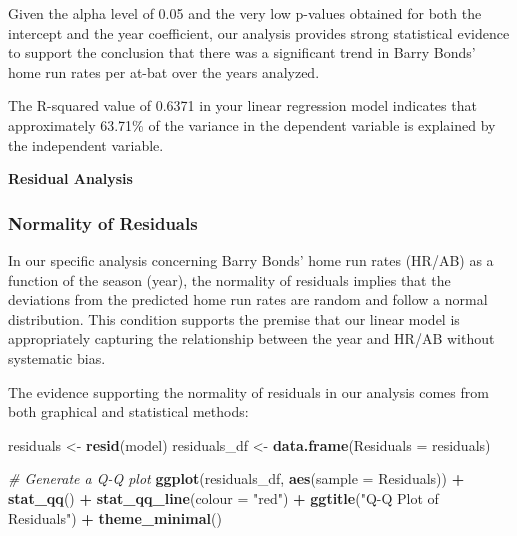 \documentclass[
]{article}
\newenvironment{Shaded}{\begin{snugshade}}{\end{snugshade}}
\newcommand{\AttributeTok}[1]{\textcolor[rgb]{0.13,0.29,0.53}{#1}}
\newcommand{\CommentTok}[1]{\textcolor[rgb]{0.56,0.35,0.01}{\textit{#1}}}
\newcommand{\FunctionTok}[1]{\textcolor[rgb]{0.13,0.29,0.53}{\textbf{#1}}}
\newcommand{\NormalTok}[1]{#1}
\newcommand{\OtherTok}[1]{\textcolor[rgb]{0.56,0.35,0.01}{#1}}
\newcommand{\SpecialCharTok}[1]{\textcolor[rgb]{0.81,0.36,0.00}{\textbf{#1}}}
\newcommand{\StringTok}[1]{\textcolor[rgb]{0.31,0.60,0.02}{#1}}
\begin{document}
Given the alpha level of 0.05 and the very low p-values obtained for
both the intercept and the year coefficient, our analysis provides
strong statistical evidence to support the conclusion that there was a
significant trend in Barry Bonds' home run rates per at-bat over the
years analyzed.

The R-squared value of 0.6371 in your linear regression model indicates
that approximately 63.71\% of the variance in the dependent variable is
explained by the independent variable.

\textbf{Residual Analysis}

\subsubsection{Normality of Residuals}\label{normality-of-residuals}

In our specific analysis concerning Barry Bonds' home run rates (HR/AB)
as a function of the season (year), the normality of residuals implies
that the deviations from the predicted home run rates are random and
follow a normal distribution. This condition supports the premise that
our linear model is appropriately capturing the relationship between the
year and HR/AB without systematic bias.

The evidence supporting the normality of residuals in our analysis comes
from both graphical and statistical methods:

\begin{Shaded}
\begin{Highlighting}[]
\NormalTok{residuals }\OtherTok{\textless{}{-}} \FunctionTok{resid}\NormalTok{(model)}
\NormalTok{residuals\_df }\OtherTok{\textless{}{-}} \FunctionTok{data.frame}\NormalTok{(}\AttributeTok{Residuals =}\NormalTok{ residuals)}

\CommentTok{\# Generate a Q{-}Q plot}
\FunctionTok{ggplot}\NormalTok{(residuals\_df, }\FunctionTok{aes}\NormalTok{(}\AttributeTok{sample =}\NormalTok{ Residuals)) }\SpecialCharTok{+} \FunctionTok{stat\_qq}\NormalTok{() }\SpecialCharTok{+} \FunctionTok{stat\_qq\_line}\NormalTok{(}\AttributeTok{colour =} \StringTok{"red"}\NormalTok{) }\SpecialCharTok{+}
    \FunctionTok{ggtitle}\NormalTok{(}\StringTok{"Q{-}Q Plot of Residuals"}\NormalTok{) }\SpecialCharTok{+} \FunctionTok{theme\_minimal}\NormalTok{()}
\end{Highlighting}
\end{Shaded}
\end{document}
